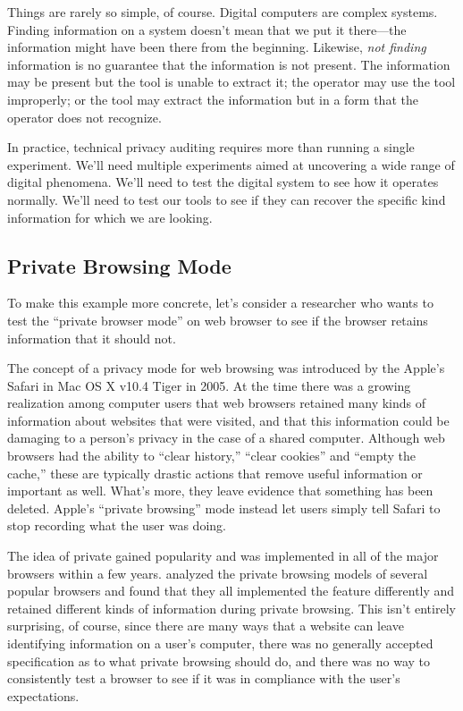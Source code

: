 Things are rarely so simple, of course. Digital computers are
complex systems. Finding information on a system doesn't mean that we
put it there---the information might have been there from the
beginning. Likewise, \emph{not finding} information is no guarantee
that the information is not present. The information may be present
but the tool is unable to extract it; the operator may use the tool
improperly; or the tool may extract the information but in a form that
the operator does not recognize.

In practice, technical privacy auditing requires more than running a single
experiment. We'll need multiple experiments aimed at uncovering a wide
range of digital phenomena. We'll need to test the digital system
to see how it operates normally. We'll need to test our tools to see
if they can recover the specific kind information for which we are
looking.

\subsection{Private Browsing Mode}

To make this example more concrete, let's consider a researcher who
wants to test the ``private browser mode'' on web browser to see if
the browser retains information that it should not.

The concept of a privacy mode for web browsing was introduced by the
Apple's Safari in Mac OS X v10.4 Tiger in 2005. At the time there was
a growing realization among computer users that web browsers
retained many kinds of information about websites that were
visited, and that this information could be damaging to a person's
privacy in the case of a shared computer. Although web browsers had
the ability to ``clear history,'' ``clear cookies'' and ``empty the cache,'' these are
typically drastic actions that remove useful information or important
as well. What's more, they leave evidence that something has been
deleted. Apple's ``private browsing'' mode instead let users simply
tell Safari to stop recording what the user was doing.

The idea of private gained popularity and was implemented in all of
the major browsers within a few
years. \cite{Aggarwal:2010:APB:1929820.1929828} analyzed the private
browsing models of several popular browsers and found that they all
implemented the feature differently and retained different kinds of
information during private browsing. This isn't entirely surprising,
of course, since there are many ways that a website can leave
identifying information on a user's computer, there was no generally
accepted specification as to what private browsing should do, and
there was no way to consistently test a browser to see if it was in
compliance with the user's expectations.

